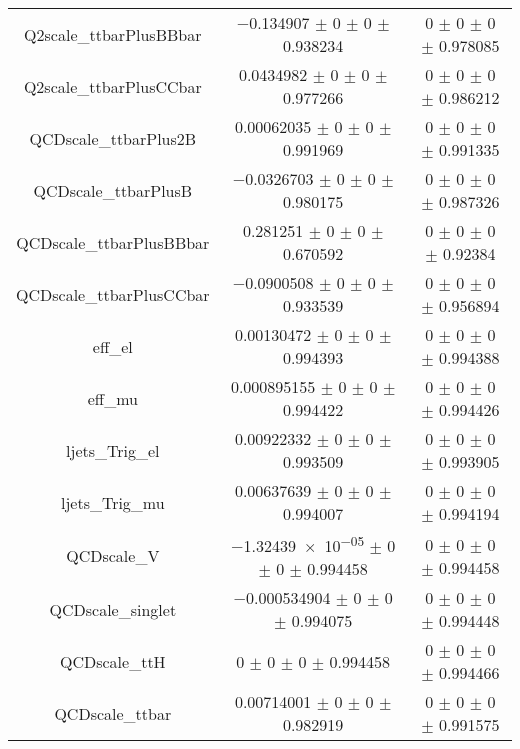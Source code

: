 \begin{table}
\begin{tabular}{ccc}
Q2scale\_ttbarPlusBBbar & \num{-0.134907} $\pm$ \num{0} $\pm$ \num{0} $\pm$ \num{0.938234} & \num{0} $\pm$ \num{0} $\pm$ \num{0} $\pm$ \num{0.978085}\\
Q2scale\_ttbarPlusCCbar & \num{0.0434982} $\pm$ \num{0} $\pm$ \num{0} $\pm$ \num{0.977266} & \num{0} $\pm$ \num{0} $\pm$ \num{0} $\pm$ \num{0.986212}\\
QCDscale\_ttbarPlus2B & \num{0.00062035} $\pm$ \num{0} $\pm$ \num{0} $\pm$ \num{0.991969} & \num{0} $\pm$ \num{0} $\pm$ \num{0} $\pm$ \num{0.991335}\\
QCDscale\_ttbarPlusB & \num{-0.0326703} $\pm$ \num{0} $\pm$ \num{0} $\pm$ \num{0.980175} & \num{0} $\pm$ \num{0} $\pm$ \num{0} $\pm$ \num{0.987326}\\
QCDscale\_ttbarPlusBBbar & \num{0.281251} $\pm$ \num{0} $\pm$ \num{0} $\pm$ \num{0.670592} & \num{0} $\pm$ \num{0} $\pm$ \num{0} $\pm$ \num{0.92384}\\
QCDscale\_ttbarPlusCCbar & \num{-0.0900508} $\pm$ \num{0} $\pm$ \num{0} $\pm$ \num{0.933539} & \num{0} $\pm$ \num{0} $\pm$ \num{0} $\pm$ \num{0.956894}\\
eff\_el & \num{0.00130472} $\pm$ \num{0} $\pm$ \num{0} $\pm$ \num{0.994393} & \num{0} $\pm$ \num{0} $\pm$ \num{0} $\pm$ \num{0.994388}\\
eff\_mu & \num{0.000895155} $\pm$ \num{0} $\pm$ \num{0} $\pm$ \num{0.994422} & \num{0} $\pm$ \num{0} $\pm$ \num{0} $\pm$ \num{0.994426}\\
ljets\_Trig\_el & \num{0.00922332} $\pm$ \num{0} $\pm$ \num{0} $\pm$ \num{0.993509} & \num{0} $\pm$ \num{0} $\pm$ \num{0} $\pm$ \num{0.993905}\\
ljets\_Trig\_mu & \num{0.00637639} $\pm$ \num{0} $\pm$ \num{0} $\pm$ \num{0.994007} & \num{0} $\pm$ \num{0} $\pm$ \num{0} $\pm$ \num{0.994194}\\
QCDscale\_V & \num{-1.32439e-05} $\pm$ \num{0} $\pm$ \num{0} $\pm$ \num{0.994458} & \num{0} $\pm$ \num{0} $\pm$ \num{0} $\pm$ \num{0.994458}\\
QCDscale\_singlet & \num{-0.000534904} $\pm$ \num{0} $\pm$ \num{0} $\pm$ \num{0.994075} & \num{0} $\pm$ \num{0} $\pm$ \num{0} $\pm$ \num{0.994448}\\
QCDscale\_ttH & \num{0} $\pm$ \num{0} $\pm$ \num{0} $\pm$ \num{0.994458} & \num{0} $\pm$ \num{0} $\pm$ \num{0} $\pm$ \num{0.994466}\\
QCDscale\_ttbar & \num{0.00714001} $\pm$ \num{0} $\pm$ \num{0} $\pm$ \num{0.982919} & \num{0} $\pm$ \num{0} $\pm$ \num{0} $\pm$ \num{0.991575}\\

\end{tabular}
\end{table}

